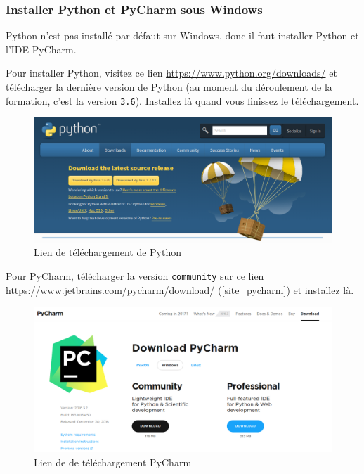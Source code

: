 \documentclass[12pt]{article}
\newcommand{\code}[1]{\colorbox{light-gray}{\texttt{#1}}}
\begin{document}
        \subsubsection{Installer Python et PyCharm sous Windows}
            Python n'est pas installé par défaut sur Windows, donc il faut installer Python et l'IDE PyCharm.

            Pour installer Python, visitez ce lien
            \href{https://www.python.org/downloads/}{https://www.python.org/downloads/} et télécharger la
            dernière version de Python (au moment du déroulement de la formation, c'est la version \code{3.6}).
            Installez là quand vous finissez le téléchargement.

            \begin{figure}[H]
                \centering
                \includegraphics[width=\linewidth]{img/8_python_download.png}
                \caption{Lien de téléchargement de Python}
            \end{figure}

            Pour PyCharm, télécharger la version \code{community} sur ce lien \href{https://www.jetbrains.com/pycharm/download/}{https://www.jetbrains.com/pycharm/download/} (\autoref{site_pycharm}) et installez là.

            \begin{figure}[H]
                \centering
                \includegraphics[width=\linewidth]{img/8_pycharm_download.png}
                \caption{Lien de de téléchargement PyCharm}
                \label{site_pycharm}
            \end{figure}
\end{document}
